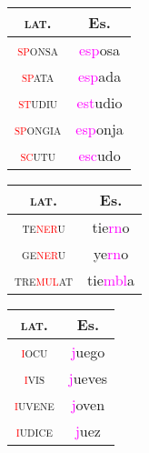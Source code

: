 \documentclass{report}
\begin{document}
\begin{tcolorbox}[title=Prothesis in /sC/]

\end{tcolorbox}

\begin{tabular}{c c}
  \textsc{lat.} & Es. \\
  \hline
  \textsc{\textcolor{red}{sp}onsa} & \textcolor{magenta}{esp}osa \\
  \textsc{\textcolor{red}{sp}ata} & \textcolor{magenta}{esp}ada \\
  \textsc{\textcolor{red}{st}udiu} & \textcolor{magenta}{est}udio \\
  \textsc{\textcolor{red}{sp}ongia} & \textcolor{magenta}{esp}onja \\
  \textsc{\textcolor{red}{sc}utu} & \textcolor{magenta}{esc}udo \\
\end{tabular}

\begin{tcolorbox}[title=Nasal Liquid Cluster from Syncope]
  
\end{tcolorbox}

\begin{tabular}{c c}
  \textsc{lat.} & Es. \\
  \hline
  \textsc{te\textcolor{red}{ner}u} & tie\textcolor{magenta}{rn}o \\
  \textsc{ge\textcolor{red}{ner}u} & ye\textcolor{magenta}{rn}o \\
  \textsc{tre\textcolor{red}{mul}at} & tie\textcolor{magenta}{mbl}a \\
\end{tabular}

\begin{tcolorbox}[title=Nasal Nasal Cluster from Syncope]
  
\end{tcolorbox}

\begin{tcolorbox}[title=Betacism I]

\end{tcolorbox}

\begin{tcolorbox}[title=Initial Yod Fortition]

\end{tcolorbox}

\begin{tabular}{c c}
  \textsc{lat.} & Es. \\
  \hline
  \textsc{\textcolor{red}{i}ocu} & \textcolor{magenta}{j}uego \quad [x] \\
  \textsc{\textcolor{red}{i}vis} & \textcolor{magenta}{j}ueves \quad [x] \\
  \textsc{\textcolor{red}{i}uvene} & \textcolor{magenta}{j}oven \quad [x] \\
  \textsc{\textcolor{red}{i}udice} & \textcolor{magenta}{j}uez \quad [x] \\
\end{tabular}
\end{document}
